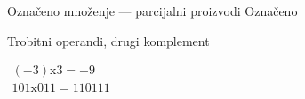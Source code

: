 
\begin{frame}[label=05-s038]{Označeno množenje — parcijalni proizvodi}
\fontsize{10}{12}\selectfont
Označeno\par Trobitni operandi, drugi komplement\par $\begin{gathered}(-3)\mathrm{x}3=-9\\101\mathrm{x}011=110111\end{gathered}$
\begin{center}\par\vspace{3mm}{\Large\textcolor{DEcrvena}{?}}\end{center}
\end{frame}
